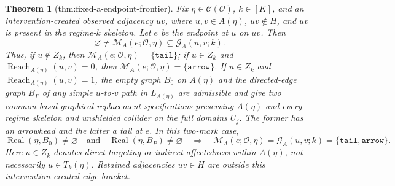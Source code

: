 \documentclass{article}
\newtheorem{theorem}{Theorem}
\begin{document}
\begin{theorem}[thm:fixed-a-endpoint-frontier]\label{thm:fixed-a-endpoint-frontier}
Fix \(\eta\in\mathcal C(\mathcal O)\), \(k\in[K]\), and an intervention-created observed adjacency \(uv\), where \(u,v\in A(\eta)\), \(uv\notin H\), and \(uv\) is present in the regime-\(k\) skeleton. Let \(e\) be the endpoint at \(u\) on \(uv\). Then
\[
 \varnothing\ne\mathcal M_A(e;\mathcal O,\eta)
 \subseteq \mathcal G_A(u,v;k).
\]
Thus, if \(u\notin Z_k\), then \(\mathcal M_A(e;\mathcal O,\eta)=\{\mathtt{tail}\}\); if \(u\in Z_k\) and \(\operatorname{Reach}_{A(\eta)}(u,v)=0\), then \(\mathcal M_A(e;\mathcal O,\eta)=\{\mathtt{arrow}\}\). If \(u\in Z_k\) and \(\operatorname{Reach}_{A(\eta)}(u,v)=1\), the empty graph \(B_0\) on \(A(\eta)\) and the directed-edge graph \(B_P\) of any simple \(u\)-to-\(v\) path in \(L_{A(\eta)}\) are admissible and give two common-basal graphical replacement specifications preserving \(A(\eta)\) and every regime skeleton and unshielded collider on the full domains \(U_j\). The former has an arrowhead and the latter a tail at \(e\). In this two-mark case,
\[
 \operatorname{Real}(\eta,B_0)\ne\varnothing
 \quad\text{and}\quad
 \operatorname{Real}(\eta,B_P)\ne\varnothing
 \quad\Longrightarrow\quad
 \mathcal M_A(e;\mathcal O,\eta)=\mathcal G_A(u,v;k)
 =\{\mathtt{tail},\mathtt{arrow}\}.
\]
Here \(u\in Z_k\) denotes direct targeting or indirect affectedness within \(A(\eta)\), not necessarily \(u\in T_k(\eta)\). Retained adjacencies \(uv\in H\) are outside this intervention-created-edge bracket.
\end{theorem}
\end{document}
